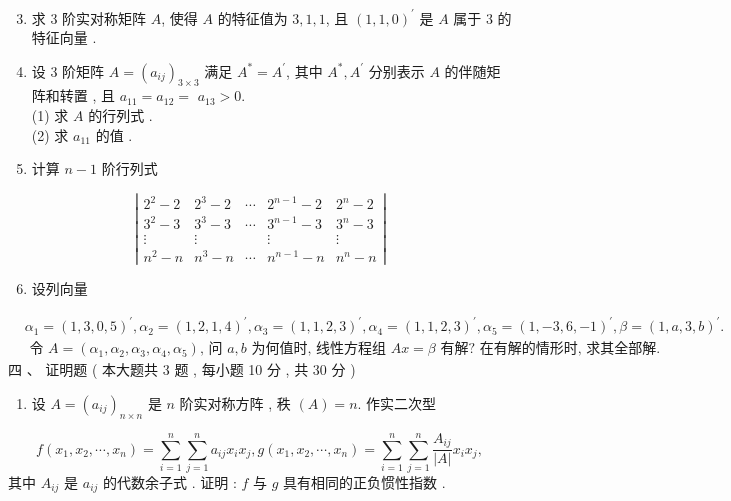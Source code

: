 \documentclass[10pt]{article}
\begin{document}
{\begin{enumerate}
  \setcounter{enumi}{2}
  \item  求  3  阶实对称矩阵  $A$,  使得  $A$  的特征值为  $3,1,1$,  且  $(1,1,0)^{\prime}$  是  $A$  属于  3  的特征向量 .

  \item  设  3  阶矩阵  $A=\left(a_{i j}\right)_{3 \times 3}$  满足  $A^{*}=A^{\prime}$,  其中  $A^{*}, A^{\prime}$  分别表示  $A$  的伴随矩阵和转置 ,  且  $a_{11}=a_{12}=$ $a_{13}>0$.\\
(1)  求  $A$  的行列式 .\\
(2)  求  $a_{11}$  的值 .

  \item  计算  $n-1$  阶行列式 

\end{enumerate}
$$
\left|\begin{array}{ccccc}
2^{2}-2 & 2^{3}-2 & \cdots & 2^{n-1}-2 & 2^{n}-2 \\
3^{2}-3 & 3^{3}-3 & \cdots & 3^{n-1}-3 & 3^{n}-3 \\
\vdots & \vdots & & \vdots & \vdots \\
n^{2}-n & n^{3}-n & \cdots & n^{n-1}-n & n^{n}-n
\end{array}\right|
$$

\begin{enumerate}
  \setcounter{enumi}{5}
  \item  设列向量 
\end{enumerate}
$$
\begin{aligned}
&\alpha_{1}=(1,3,0,5)^{\prime}, \alpha_{2}=(1,2,1,4)^{\prime}, \alpha_{3}=(1,1,2,3)^{\prime}, \alpha_{4}=(1,1,2,3)^{\prime}, \alpha_{5}=(1,-3,6,-1)^{\prime}, \beta=(1, a, 3, b)^{\prime} . \\
&\text { 令 } A=\left(\alpha_{1}, \alpha_{2}, \alpha_{3}, \alpha_{4}, \alpha_{5}\right) \text {, 问 } a, b \text { 为何值时, 线性方程组 } A x=\beta \text { 有解? 在有解的情形时, 求其全部解. }
\end{aligned}
$$
 四 、 证明题 ( 本大题共  3  题 ,  每小题  10  分 ,  共  30  分 )

\begin{enumerate}
  \item  设  $A=\left(a_{i j}\right)_{n \times n}$  是  $n$  阶实对称方阵 ,  秩  $(A)=n$.  作实二次型 
\end{enumerate}
$$
f\left(x_{1}, x_{2}, \cdots, x_{n}\right)=\sum_{i=1}^{n} \sum_{j=1}^{n} a_{i j} x_{i} x_{j}, g\left(x_{1}, x_{2}, \cdots, x_{n}\right)=\sum_{i=1}^{n} \sum_{j=1}^{n} \frac{A_{i j}}{|A|} x_{i} x_{j},
$$
 其中  $A_{i j}$  是  $a_{i j}$  的代数余子式 .  证明 : $f$  与  $g$  具有相同的正负惯性指数 .

}
\end{document}
